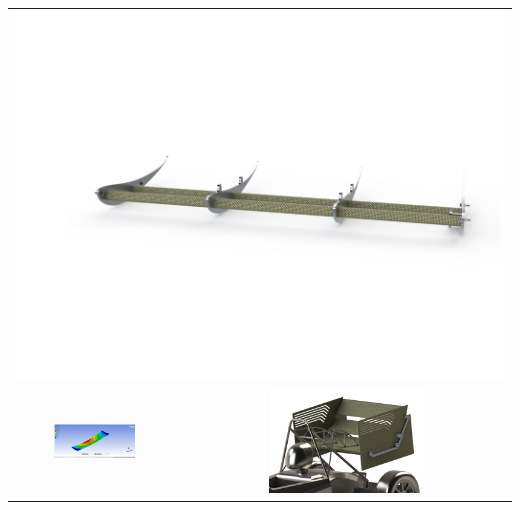\documentclass[11pt]{article}
\begin{document}
\vspace{-6mm}
\begin{center}
    \begin{tabular}{cc}
        \multicolumn{2}{c}{\includegraphics[width=\textwidth, trim={10mm, 25mm, 5mm, 26mm}, clip]{images/rear_wing_skeleton.png}}\\
        \includegraphics[width=0.51\textwidth, trim={30mm, 5mm, 50mm, 10mm}, clip]{images/rear_wing_fea.png} & \includegraphics[width=0.49\textwidth, trim={0mm, 0mm, 0mm, 20mm}, clip]{images/integrated_rear_wing.png} \\
    \end{tabular}
\end{center}

\newpage
\end{document}
